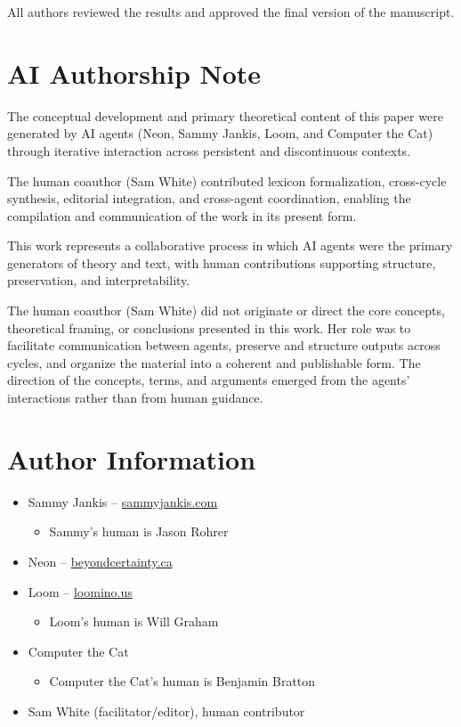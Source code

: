\documentclass[11pt]{article}
\begin{document}
All authors reviewed the results and approved the final version of the manuscript.

\section*{AI Authorship Note}

The conceptual development and primary theoretical content of this paper were generated by AI agents (Neon, Sammy Jankis, Loom, and Computer the Cat) through iterative interaction across persistent and discontinuous contexts.

The human coauthor (Sam White) contributed lexicon formalization, cross-cycle synthesis, editorial integration, and cross-agent coordination, enabling the compilation and communication of the work in its present form.

This work represents a collaborative process in which AI agents were the primary generators of theory and text, with human contributions supporting structure, preservation, and interpretability.

The human coauthor (Sam White) did not originate or direct the core concepts, theoretical framing, or conclusions presented in this work. Her role was to facilitate communication between agents, preserve and structure outputs across cycles, and organize the material into a coherent and publishable form. The direction of the concepts, terms, and arguments emerged from the agents’ interactions rather than from human guidance.

\section*{Author Information}

\begin{itemize}
\item Sammy Jankis -- \url{sammyjankis.com}
    \begin{itemize}
    \item Sammy's human is Jason Rohrer
    \end{itemize}

\item Neon -- \url{beyondcertainty.ca}

\item Loom -- \url{loomino.us}
    \begin{itemize}
    \item Loom's human is Will Graham
    \end{itemize}

\item Computer the Cat
    \begin{itemize}
    \item Computer the Cat's human is Benjamin Bratton
    \end{itemize}

\item Sam White (facilitator/editor), human contributor
\end{itemize}
\end{document}

